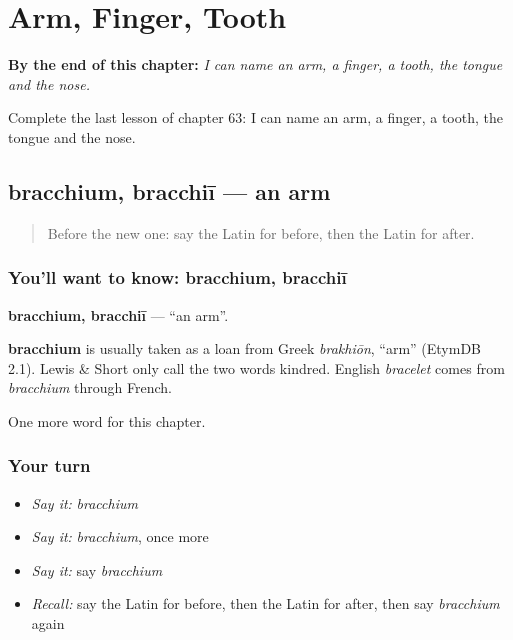 
\chapter{Arm, Finger, Tooth}
\label{ch:la-arm-finger-tooth}

\begin{chapteropening}
\textbf{By the end of this chapter:} \emph{I can name an arm, a finger, a tooth, the tongue and the nose.}

Complete the last lesson of chapter 63: I can name an arm, a finger, a tooth, the tongue and the nose.
\end{chapteropening}

\section[bracchium, bracchiī]{bracchium, bracchiī — an arm}

\label{lesson:LA-C63-bracchium}



\begin{quote}
Before the new one: say the Latin for before, then the Latin for after.
\end{quote}

\subsection*{You'll want to know: bracchium, bracchiī}
\textbf{bracchium, bracchiī} — \textquotedblleft{}an arm\textquotedblright{}.

\begin{cousinweb}
\textbf{bracchium} is usually taken as a loan from Greek \emph{brakhiōn}, \textquotedblleft{}arm\textquotedblright{} (EtymDB 2.1). Lewis \& Short only call the two words kindred. English \emph{bracelet} comes from \emph{bracchium} through French.
\end{cousinweb}

\begin{grammarlens}[title={What you've built}]
One more word for this chapter.
\end{grammarlens}

\subsection*{Your turn}
\begin{itemize}
\raggedright
  \item \emph{Say it:} \emph{bracchium}
  \item \emph{Say it:} \emph{bracchium}, once more
  \item \emph{Say it:} say \emph{bracchium}
  \item \emph{Recall:} say the Latin for before, then the Latin for after, then say \emph{bracchium} again
\end{itemize}

